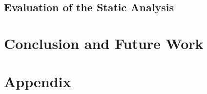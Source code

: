 \documentclass[10pt]{report}
\begin{document}
\section{Evaluation of the Static Analysis} \label{analysis-evaluation}

\chapter{Conclusion and Future Work} \label{conclusion}


\appendix
\chapter{Appendix} 





\end{document}
